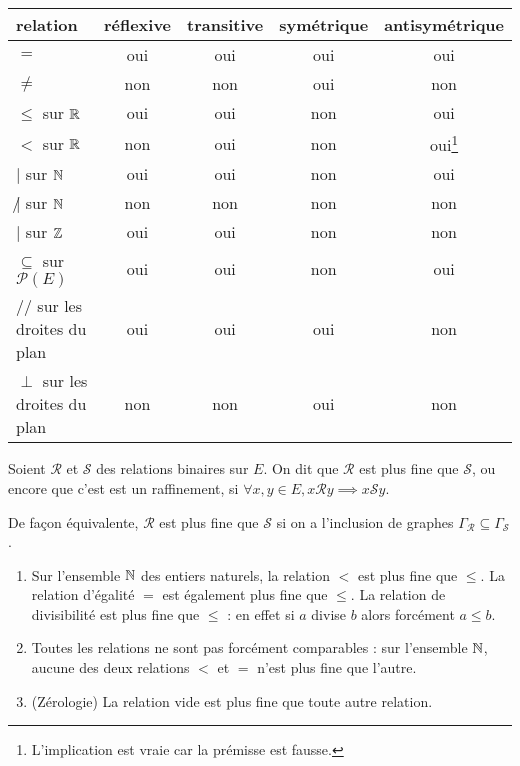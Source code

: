 \begin{tabular}{|l|c|c|c|c|}\hline
relation & réflexive & transitive & symétrique & antisymétrique \\ \hline
$=$ & oui & oui & oui & oui \\ \hline
$\neq$ & non & non & oui & non \\ \hline
$\leq$ sur $\mathbb{R}$ & oui & oui & non & oui \\ \hline
$<$ sur $\mathbb{R}$ & non & oui & non & oui\footnote{L'implication est vraie car la prémisse est fausse.} \\ \hline
$|$ sur $\mathbb{N}$ & oui & oui & non & oui \\ \hline
$\not |$ sur $\mathbb{N}$ & non & non & non & non \\ \hline
$|$ sur $\mathbb{Z}$ & oui & oui & non & non \\ \hline
$\subseteq$ sur $\mathcal P(E)$ & oui & oui & non & oui \\ \hline
$//$ sur les droites du plan & oui & oui & oui & non \\ \hline
$\perp$ sur les droites du plan & non & non & oui & non \\ \hline
\end{tabular}

\begin{definition}
Soient $\mathcal R$ et $\mathcal S$ des relations binaires sur $E$. On dit que $\mathcal R$ est plus fine que $\mathcal S$, ou encore que c'est est un raffinement, si $\forall x, y\in E, x\mathcal R y \implies x\mathcal S y$. 

De façon équivalente, $\mathcal R$ est plus fine que $\mathcal S$ si on a l'inclusion de graphes $\Gamma_{\mathcal R} \subseteq \Gamma_{\mathcal S}$.
\end{definition}

\begin{exemple}
\begin{enumerate}
\item Sur l'ensemble $\mathbb{N}$ des entiers naturels, la relation $<$ est plus fine que $\leq$. La relation d'égalité $=$ est également plus fine que $\leq$. La relation de divisibilité est plus fine que $\leq$ : en effet si $a$ divise $b$ alors forcément $a\leq b$.
\item Toutes les relations ne sont pas forcément comparables : sur l'ensemble $\mathbb{N}$, aucune des deux relations $<$ et $=$  n'est plus fine que l'autre.
\item (Zérologie) La relation vide est plus fine que toute autre relation.
\end{enumerate}
\end{exemple}

